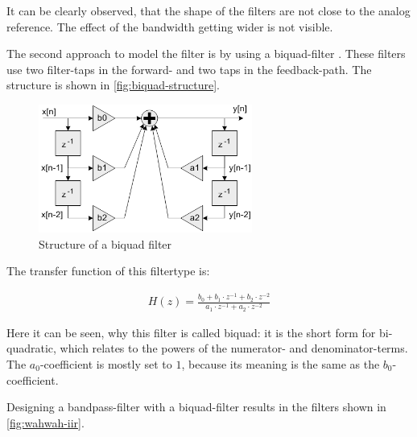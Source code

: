 It can be clearly observed, that the shape of the filters are not close to the analog reference.
The effect of the bandwidth getting wider is not visible.

The second approach to model the filter is by using a biquad-filter \cite{arm_dsp}.
These filters use two filter-taps in the forward- and two taps in the feedback-path. The structure
is shown in \autoref{fig:biquad-structure}.

\begin{figure}[!h]
    \centering
    \includegraphics[width=7cm]{img/biquad_structure.png}
    \caption{Structure of a biquad filter \cite{arm_dsp}}
    \label{fig:biquad-structure}
\end{figure}

The transfer function of this filtertype is:

\begin{align}
    H(z) = \frac{b_0 + b_1 \cdot z^{-1} + b_2 \cdot z^{-2}}{a_1 \cdot z^{-1} + a_2 \cdot z^{-2}}
\end{align}

Here it can be seen, why this filter is called \frqq biquad\flqq{}: it is the short form for
\frqq bi-quadratic\flqq{}, which relates to the powers of the numerator- and denominator-terms.
The $a_0$-coefficient is mostly set to $1$, because its meaning is the same as the $b_0$-coefficient.

Designing a bandpass-filter with a biquad-filter results in the filters shown in \autoref{fig:wahwah-iir}.

